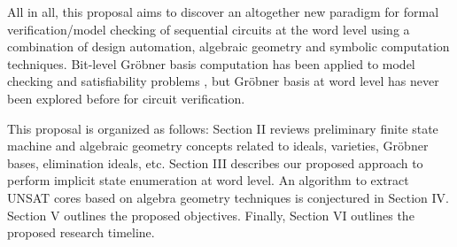 All in all, this proposal aims to discover an altogether new paradigm for formal verification/model checking
of sequential circuits at the word level using a combination of design automation, algebraic geometry and 
symbolic computation techniques. Bit-level Gr\"obner basis computation has been applied to model 
checking \cite{avrunin1996symbolic} \cite{tran2007groebner} and satisfiability problems \cite{PolyBoRi},
but Gr\"obner basis at word level has never been explored before for circuit verification.


This proposal is organized as follows: 
Section II reviews preliminary finite state machine and algebraic geometry concepts related to ideals, varieties, Gr\"obner bases, elimination ideals, etc.
Section III describes our proposed approach to perform implicit state enumeration at word level.
An algorithm to extract UNSAT cores based on algebra geometry techniques is conjectured in Section IV. 
Section V outlines the proposed objectives. Finally, Section VI outlines the proposed research timeline.
